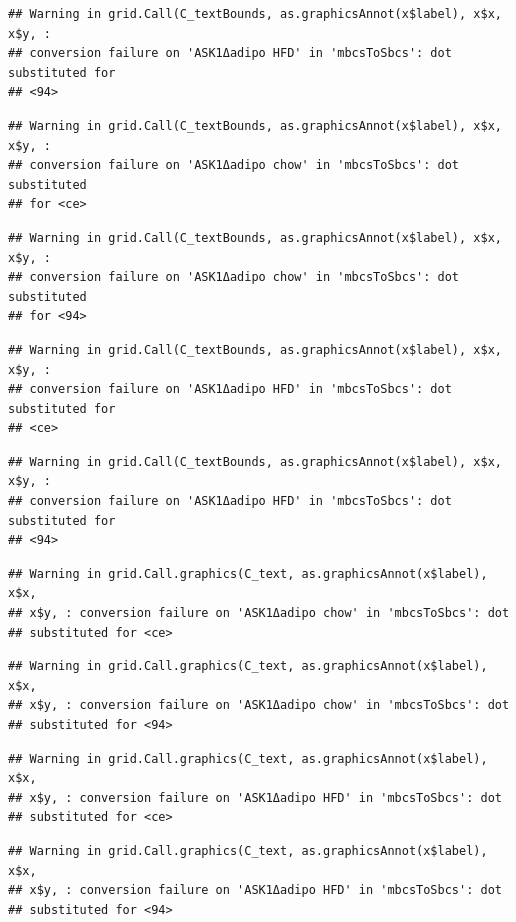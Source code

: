 \documentclass[]{book}
\begin{document}
\begin{verbatim}
## Warning in grid.Call(C_textBounds, as.graphicsAnnot(x$label), x$x, x$y, :
## conversion failure on 'ASK1Δadipo HFD' in 'mbcsToSbcs': dot substituted for
## <94>
\end{verbatim}

\begin{verbatim}
## Warning in grid.Call(C_textBounds, as.graphicsAnnot(x$label), x$x, x$y, :
## conversion failure on 'ASK1Δadipo chow' in 'mbcsToSbcs': dot substituted
## for <ce>
\end{verbatim}

\begin{verbatim}
## Warning in grid.Call(C_textBounds, as.graphicsAnnot(x$label), x$x, x$y, :
## conversion failure on 'ASK1Δadipo chow' in 'mbcsToSbcs': dot substituted
## for <94>
\end{verbatim}

\begin{verbatim}
## Warning in grid.Call(C_textBounds, as.graphicsAnnot(x$label), x$x, x$y, :
## conversion failure on 'ASK1Δadipo HFD' in 'mbcsToSbcs': dot substituted for
## <ce>
\end{verbatim}

\begin{verbatim}
## Warning in grid.Call(C_textBounds, as.graphicsAnnot(x$label), x$x, x$y, :
## conversion failure on 'ASK1Δadipo HFD' in 'mbcsToSbcs': dot substituted for
## <94>
\end{verbatim}

\begin{verbatim}
## Warning in grid.Call.graphics(C_text, as.graphicsAnnot(x$label), x$x,
## x$y, : conversion failure on 'ASK1Δadipo chow' in 'mbcsToSbcs': dot
## substituted for <ce>
\end{verbatim}

\begin{verbatim}
## Warning in grid.Call.graphics(C_text, as.graphicsAnnot(x$label), x$x,
## x$y, : conversion failure on 'ASK1Δadipo chow' in 'mbcsToSbcs': dot
## substituted for <94>
\end{verbatim}

\begin{verbatim}
## Warning in grid.Call.graphics(C_text, as.graphicsAnnot(x$label), x$x,
## x$y, : conversion failure on 'ASK1Δadipo HFD' in 'mbcsToSbcs': dot
## substituted for <ce>
\end{verbatim}

\begin{verbatim}
## Warning in grid.Call.graphics(C_text, as.graphicsAnnot(x$label), x$x,
## x$y, : conversion failure on 'ASK1Δadipo HFD' in 'mbcsToSbcs': dot
## substituted for <94>
\end{verbatim}
\end{document}
